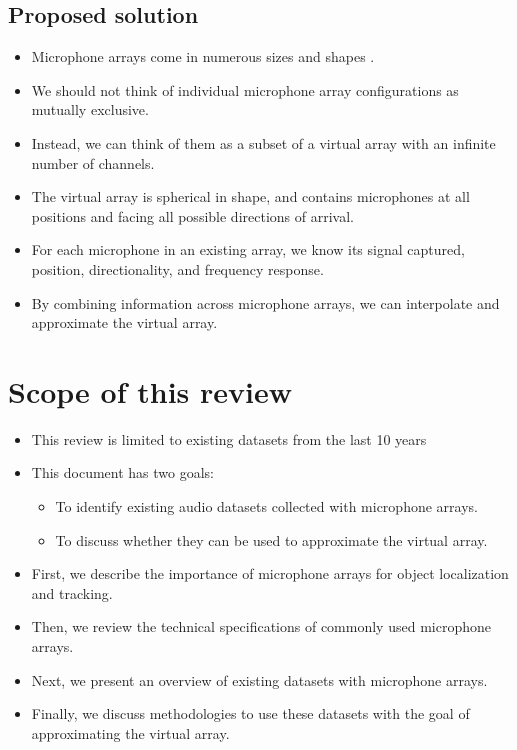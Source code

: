 \documentclass[14pt, oneside]{extarticle}
\begin{document}
\subsection{Proposed solution}

\begin{itemize}

\item Microphone arrays come in numerous sizes and shapes \cite{kurz2015comparison, bates2017comparing, lopez2019sphear}. 

\item We should not think of individual microphone array configurations as mutually exclusive.

\item Instead, we can think of them as a subset of a virtual array with an infinite number of channels.

\item The virtual array is spherical in shape, and contains microphones at all positions and facing all possible directions of arrival.

\item For each microphone in an existing array, we know its signal captured, position, directionality, and frequency response. 

\item By combining information across microphone arrays, we can interpolate and approximate the virtual array.

\end{itemize}

\section{Scope of this review}

\begin{itemize}

\item This review is limited to existing datasets from the last 10 years

\item This document has two goals:
	\begin{itemize}
	\item To identify existing audio datasets collected with microphone arrays. 
	\item To discuss whether they can be used to approximate the virtual array. 
	\end{itemize}

\item First, we describe the importance of microphone arrays for object localization and tracking.

\item Then, we review the technical specifications of commonly used microphone arrays.

\item Next, we present an overview of existing datasets with microphone arrays.

\item Finally, we discuss methodologies to use these datasets with the goal of approximating the virtual array.  

\end{itemize}
\end{document}
